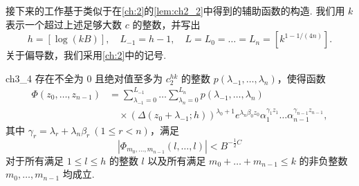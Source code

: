 接下来的工作基于类似于在\autoref{ch:2}的\autoref{lem:ch2_2}中得到的辅助函数的构造. 我们用 $k$ 表示一个超过上述足够大数 $c$ 的整数，并写出
\[
h = [\log (kB)], \quad L_{-1} = h-1, \quad L = L_0 = \dots = L_n = \left[k^{1-1/(4n)}\right].
\]
关于偏导数，我们采用\autoref{ch:2}中的记号.

\begin{mylemma}{}{ch3_4}
存在不全为 $0$ 且绝对值至多为 $c_2^{hk}$ 的整数 $p(\lambda_{-1}, \dots, \lambda_n)$，使得函数
\begin{align*}
\Phi(z_0, \dots, z_{n-1}) &= \sum_{\lambda_{-1}=0}^{L_{-1}} \dots \sum_{\lambda_n=0}^{L_n} p(\lambda_{-1}, \dots, \lambda_n) \\
&\quad \times (\Delta(z_0 + \lambda_{-1}; h))^{\lambda_0 + 1} e^{\lambda_n \beta_0 z_0} \alpha_1^{\gamma_1 z_1} \dots \alpha_{n-1}^{\gamma_{n-1} z_{n-1}},
\end{align*}
其中 $\gamma_r = \lambda_r + \lambda_n \beta_r \ (1 \le r < n)$，满足
\begin{equation} \label{eq:ch3_3}\tag{3}
|\Phi_{m_0, \dots, m_{n-1}}(l, \dots, l)| < B^{-\frac{1}{2}C}
\end{equation}
对于所有满足 $1 \le l \le h$ 的整数 $l$ 以及所有满足 $m_0 + \dots + m_{n-1} \le k$ 的非负整数 $m_0, \dots, m_{n-1}$ 均成立.
\end{mylemma}

